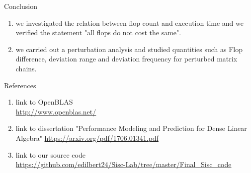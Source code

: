 \documentclass[10pts]{beamer}
\begin{document}
	  \begin{frame}{Conclusion}
	  	\begin{enumerate}[(\roman{*})]
	  	\item we investigated the relation between flop count and execution time
	  	and we verified the statement "all flops do not cost the same". 
        
       \item we carried out a perturbation analysis and studied quantities such as Flop difference, deviation range and  deviation frequency for perturbed matrix chains. 
        \end{enumerate}  	
	  \end{frame}
	  
	  
	  \begin{frame}{References}
	  	\begin{enumerate}[(\roman{*})]
	  		\item link to OpenBLAS \hspace{30pt} \\ \url{http://www.openblas.net/}
	  		\vspace{20pt}
	  		\item link to dissertation "Performance Modeling and Prediction
	  		for Dense Linear Algebra"\hspace{30pt} \url{https://arxiv.org/pdf/1706.01341.pdf}
	  		\vspace{20pt}
	  		\item link to our source code \hspace{30pt} \\
	  		\url{https://github.com/edilbert24/Sisc-Lab/tree/master/Final_Sisc_code}
	  		
	  	\end{enumerate}  	
	  \end{frame}
	  
	  
\end{document}
